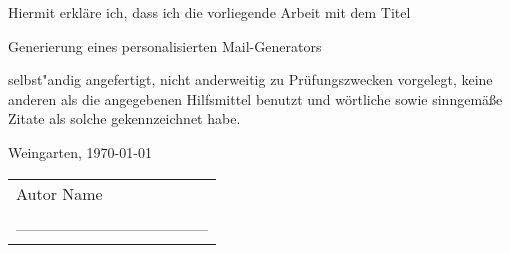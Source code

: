 
\thispagestyle{empty} %

Hiermit erkläre ich, dass ich die vorliegende Arbeit mit dem Titel \newline    %
\begin{center}
{\LARGE{Generierung eines personalisierten Mail-Generators}}
\end{center}
selbst"andig angefertigt, nicht anderweitig zu Prüfungszwecken vorgelegt, keine anderen als die angegebenen Hilfsmittel benutzt und wörtliche sowie sinngemäße Zitate als solche gekennzeichnet habe.\newline  %

\begin{flushleft}
Weingarten, \today %
\end{flushleft}

\begin{tabular}{l}   
Autor Name        \\%
 \\
------------------------------------ \\
\end{tabular}




